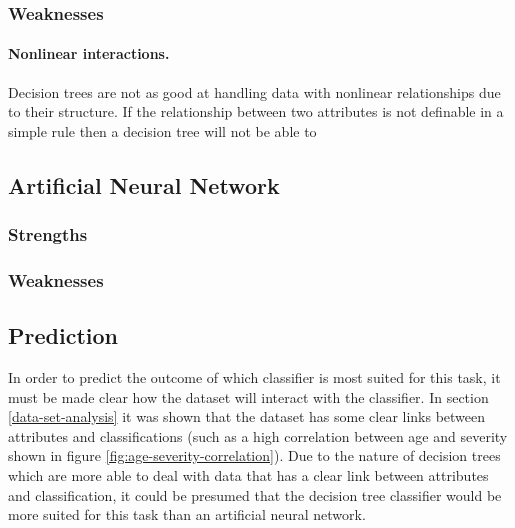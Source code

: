\documentclass[12pt]{article}
\begin{document}
    \subsubsection{Weaknesses}
      \paragraph{Nonlinear interactions.}
        Decision trees are not as good at handling data with nonlinear relationships due to their structure. If the relationship between two attributes is not definable in a simple rule then a decision tree will not be able to

  \subsection{Artificial Neural Network}
    \subsubsection{Strengths}

    \subsubsection{Weaknesses}

  \subsection{Prediction}
    In order to predict the outcome of which classifier is most suited for this task, it must be made clear how the dataset will interact with the classifier.
    In section \ref{data-set-analysis} it was shown that the dataset has some clear links between attributes and classifications (such as a high correlation between age and severity shown in figure \ref{fig:age-severity-correlation}). Due to the nature of decision trees which are more able to deal with data that has a clear link between attributes and classification, it could be presumed that the decision tree classifier would be more suited for this task than an artificial neural network.
\end{document}

